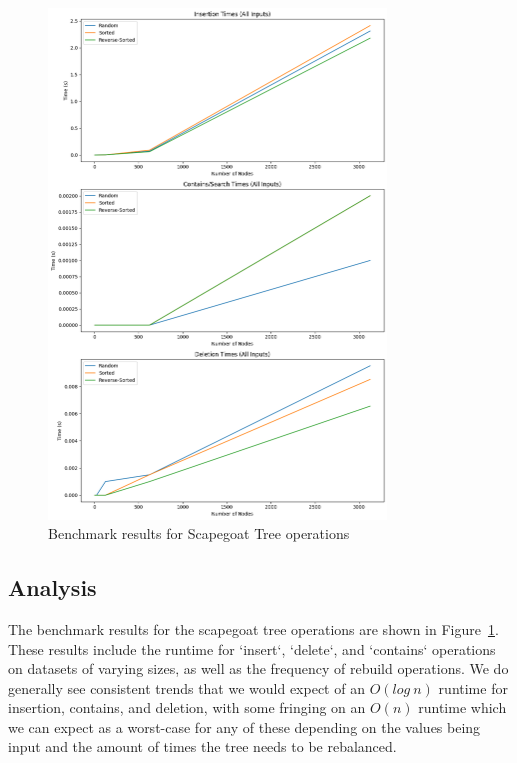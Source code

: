 \documentclass{labReport}
\begin{document}
\begin{figure}[H]
    \centering
    \includegraphics[width=0.8\textwidth]{benchmarks.png}
    \caption{Benchmark results for Scapegoat Tree operations}
    \label{fig:benchmark}
\end{figure}

\subsection{Analysis}
The benchmark results for the scapegoat tree operations are shown in Figure~\ref{fig:benchmark}. These results include the runtime for `insert`, `delete`, and `contains` operations on datasets of varying sizes, as well as the frequency of rebuild operations. We do generally see consistent trends that we would expect of an $O(log \: n)$ runtime for insertion, contains, and deletion, with some fringing on an $O(n)$ runtime which we can expect as a worst-case for any of these depending on the values being input and the amount of times the tree needs to be rebalanced.



\end{document}
